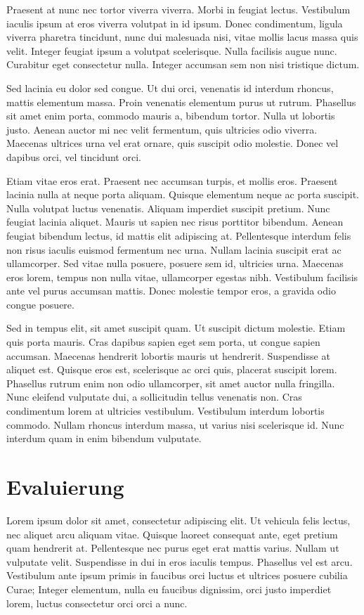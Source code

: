 \documentclass[12pt,oneside,a4paper,parskip]{scrbook}
\begin{document}
Praesent at nunc nec tortor viverra viverra. Morbi in feugiat lectus. Vestibulum iaculis ipsum at eros viverra volutpat in id ipsum. Donec condimentum, ligula viverra pharetra tincidunt, nunc dui malesuada nisi, vitae mollis lacus massa quis velit. Integer feugiat ipsum a volutpat scelerisque. Nulla facilisis augue nunc. Curabitur eget consectetur nulla. Integer accumsan sem non nisi tristique dictum.

Sed lacinia eu dolor sed congue. Ut dui orci, venenatis id interdum rhoncus, mattis elementum massa. Proin venenatis elementum purus ut rutrum. Phasellus sit amet enim porta, commodo mauris a, bibendum tortor. Nulla ut lobortis justo. Aenean auctor mi nec velit fermentum, quis ultricies odio viverra. Maecenas ultrices urna vel erat ornare, quis suscipit odio molestie. Donec vel dapibus orci, vel tincidunt orci.

Etiam vitae eros erat. Praesent nec accumsan turpis, et mollis eros. Praesent lacinia nulla at neque porta aliquam. Quisque elementum neque ac porta suscipit. Nulla volutpat luctus venenatis. Aliquam imperdiet suscipit pretium. Nunc feugiat lacinia aliquet. Mauris ut sapien nec risus porttitor bibendum. Aenean feugiat bibendum lectus, id mattis elit adipiscing at. Pellentesque interdum felis non risus iaculis euismod fermentum nec urna. Nullam lacinia suscipit erat ac ullamcorper. Sed vitae nulla posuere, posuere sem id, ultricies urna. Maecenas eros lorem, tempus non nulla vitae, ullamcorper egestas nibh. Vestibulum facilisis ante vel purus accumsan mattis. Donec molestie tempor eros, a gravida odio congue posuere.

Sed in tempus elit, sit amet suscipit quam. Ut suscipit dictum molestie. Etiam quis porta mauris. Cras dapibus sapien eget sem porta, ut congue sapien accumsan. Maecenas hendrerit lobortis mauris ut hendrerit. Suspendisse at aliquet est. Quisque eros est, scelerisque ac orci quis, placerat suscipit lorem. Phasellus rutrum enim non odio ullamcorper, sit amet auctor nulla fringilla. Nunc eleifend vulputate dui, a sollicitudin tellus venenatis non. Cras condimentum lorem at ultricies vestibulum. Vestibulum interdum lobortis commodo. Nullam rhoncus interdum massa, ut varius nisi scelerisque id. Nunc interdum quam in enim bibendum vulputate.


\chapter{Evaluierung}

Lorem ipsum dolor sit amet, consectetur adipiscing elit. Ut vehicula felis lectus, nec aliquet arcu aliquam vitae. Quisque laoreet consequat ante, eget pretium quam hendrerit at. Pellentesque nec purus eget erat mattis varius. Nullam ut vulputate velit. Suspendisse in dui in eros iaculis tempus. Phasellus vel est arcu. Vestibulum ante ipsum primis in faucibus orci luctus et ultrices posuere cubilia Curae; Integer elementum, nulla eu faucibus dignissim, orci justo imperdiet lorem, luctus consectetur orci orci a nunc.
\end{document}
